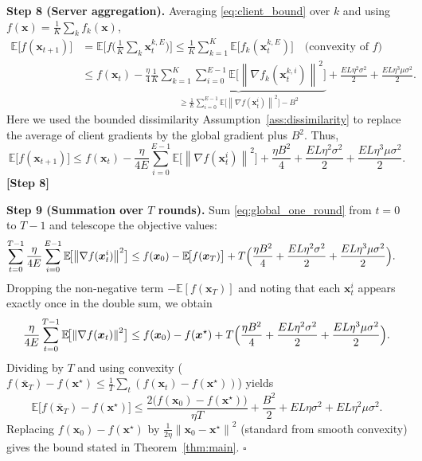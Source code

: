 \documentclass{article}
\newcommand{\E}{\mathbb{E}}
\newcommand{\norm}[1]{\left\lVert #1\right\rVert}
\begin{document}
\noindent\textbf{Step 8 (Server aggregation).}
Averaging \eqref{eq:client_bound} over $k$ and using $f(\bm{x})=\frac1K\sum_k f_k(\bm{x})$,
\begin{align}
\E\!\bigl[f(\bm{x}_{t+1})\bigr]
&= \E\!\bigl[f\!\bigl(\tfrac1K\sum_k\bm{x}_{t}^{k,E}\bigr)\bigr]
   \le \frac1K\sum_{k=1}^{K}\E\!\bigl[f_k(\bm{x}_{t}^{k,E})\bigr]   \quad\text{(convexity of $f$)} \nonumber\\
&\le f(\bm{x}_t)
   -\frac{\eta}{4}\underbrace{\frac1K\sum_{k=1}^{K}
        \sum_{i=0}^{E-1}\E\!\bigl[\norm{\nabla f_k(\bm{x}_{t}^{k,i})}^{2}\bigr]}_{\displaystyle\ge
        \frac{1}{E}\sum_{i=0}^{E-1}\E\!\bigl[\norm{\nabla f(\bm{x}_{t}^{i})}^{2}\bigr]
        -B^{2}}
   +\frac{E L\eta^{2}\sigma^{2}}{2}
   +\frac{E L\eta^{3}\mu\sigma^{2}}{2}.
\end{align}
Here we used the bounded dissimilarity Assumption~\ref{ass:dissimilarity} to replace the
average of client gradients by the global gradient plus $B^{2}$.
Thus,
\begin{equation}
\E\!\bigl[f(\bm{x}_{t+1})\bigr]
\le f(\bm{x}_t)
   -\frac{\eta}{4E}\sum_{i=0}^{E-1}\E\!\bigl[\norm{\nabla f(\bm{x}_{t}^{i})}^{2}\bigr]
   +\frac{\eta B^{2}}{4}
   +\frac{E L\eta^{2}\sigma^{2}}{2}
   +\frac{E L\eta^{3}\mu\sigma^{2}}{2}.
\label{eq:global_one_round}
\end{equation}
\textbf{[Step 8]}

\noindent\textbf{Step 9 (Summation over $T$ rounds).}
Sum \eqref{eq:global_one_round} from $t=0$ to $T-1$ and telescope the
objective values:
\begin{align}
\sum_{t=0}^{T-1}\frac{\eta}{4E}
   \sum_{i=0}^{E-1}\E\!\bigl[\norm{\nabla f(\bm{x}_{t}^{i})}^{2}\bigr]
&\le f(\bm{x}_0)-\E\!\bigl[f(\bm{x}_{T})\bigr]
   + T\Bigl(\frac{\eta B^{2}}{4}
          +\frac{E L\eta^{2}\sigma^{2}}{2}
          +\frac{E L\eta^{3}\mu\sigma^{2}}{2}\Bigr) .
\end{align}
Dropping the non‑negative term $-\E[f(\bm{x}_T)]$ and noting that each
$\bm{x}_t^{i}$ appears exactly once in the double sum, we obtain
\[
\frac{\eta}{4E}\sum_{t=0}^{T-1}\E\!\bigl[\norm{\nabla f(\bm{x}_{t})}^{2}\bigr]
   \le f(\bm{x}_0)-f(\bm{x}^\star)
   + T\Bigl(\frac{\eta B^{2}}{4}
          +\frac{E L\eta^{2}\sigma^{2}}{2}
          +\frac{E L\eta^{3}\mu\sigma^{2}}{2}\Bigr) .
\]
Dividing by $T$ and using convexity ($f(\bar{\bm{x}}_T)-f(\bm{x}^\star)
\le \frac1T\sum_t (f(\bm{x}_t)-f(\bm{x}^\star))$) yields
\[
\E\!\bigl[f(\bar{\bm{x}}_T)-f(\bm{x}^\star)\bigr]
   \le \frac{2\bigl(f(\bm{x}_0)-f(\bm{x}^\star)\bigr)}{\eta T}
        + \frac{B^{2}}{2}
        + E L\eta\sigma^{2}
        + E L\eta^{2}\mu\sigma^{2}.
\]
Replacing $f(\bm{x}_0)-f(\bm{x}^\star)$ by $\frac{1}{2\eta}\norm{\bm{x}_0-\bm{x}^\star}^{2}$
(standard from smooth convexity) gives the bound stated in
Theorem~\ref{thm:main}.  \hfill $\square$
\end{document}
